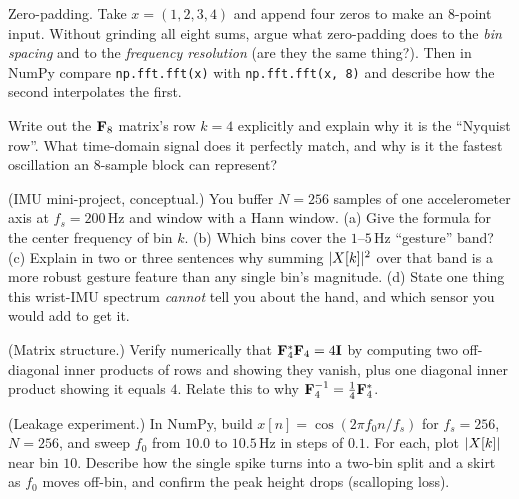 \begin{exercise}
Zero-padding. Take $x = (1,2,3,4)$ and append four zeros to make an $8$-point
input. Without grinding all eight sums, argue what zero-padding does to the
\emph{bin spacing} and to the \emph{frequency resolution} (are they the same
thing?). Then in NumPy compare \texttt{np.fft.fft(x)} with
\texttt{np.fft.fft(x, 8)} and describe how the second interpolates the first.
\end{exercise}

\begin{exercise}
Write out the $\mathbf{F}_8$ matrix's row $k=4$ explicitly and explain why it is the
``Nyquist row''. What time-domain signal does it perfectly match, and why is it the
fastest oscillation an $8$-sample block can represent?
\end{exercise}

\begin{exercise}
(IMU mini-project, conceptual.) You buffer $N=256$ samples of one accelerometer
axis at $f_s = 200$\,Hz and window with a Hann window. (a) Give the formula for the
center frequency of bin $k$. (b) Which bins cover the $1$--$5$\,Hz ``gesture''
band? (c) Explain in two or three sentences why summing $\lvert X[k]\rvert^2$ over that
band is a more robust gesture feature than any single bin's magnitude. (d) State
one thing this wrist-IMU spectrum \emph{cannot} tell you about the hand, and which
sensor you would add to get it.
\end{exercise}

\begin{exercise}
(Matrix structure.) Verify numerically that $\mathbf{F}_4^{*}\mathbf{F}_4 = 4\mathbf{I}$ by
computing two off-diagonal inner products of rows and showing they vanish, plus one
diagonal inner product showing it equals $4$. Relate this to why
$\mathbf{F}_4^{-1} = \frac14 \mathbf{F}_4^{*}$.
\end{exercise}

\begin{exercise}
(Leakage experiment.) In NumPy, build $x[n] = \cos(2\pi f_0 n / f_s)$ for
$f_s = 256$, $N = 256$, and sweep $f_0$ from $10.0$ to $10.5$\,Hz in steps of
$0.1$. For each, plot $\lvert X[k]\rvert$ near bin $10$. Describe how the single spike
turns into a two-bin split and a skirt as $f_0$ moves off-bin, and confirm the
peak height drops (scalloping loss).
\end{exercise}
